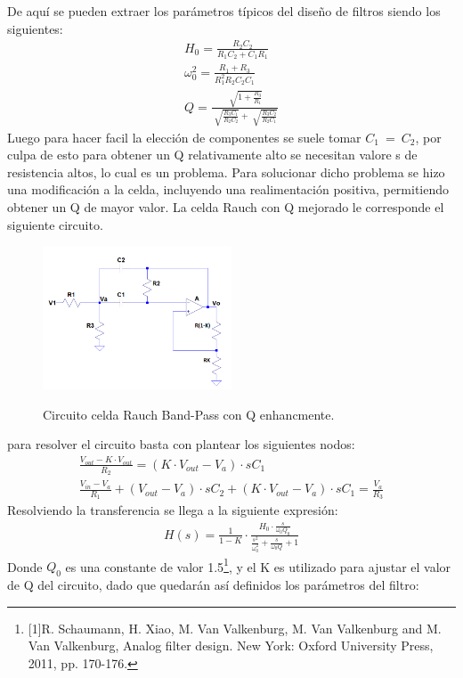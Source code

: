 De aquí se pueden extraer los parámetros típicos del diseño de filtros siendo los siguientes:
\begin{align}
H_0 =\frac{R_2C_2}{R_1C_2+C_1R_1}\\
\omega_0^2= \frac{R_1+R_3}{R_1^2R_2C_2C_1}\\
Q= \frac{\sqrt[]{1+\frac{R_3}{R_1}}}{{\sqrt[]{\frac{R_3C_1}{R_2C_2}}+\sqrt[]{\frac{R_3C_2}{R_2C_1}}}}
\end{align}
Luego para hacer facil la elección de componentes se suele tomar $C_1 \ = \ C_2$, por culpa de esto para obtener un Q relativamente alto se necesitan valore s de resistencia altos, lo cual es un problema.
Para solucionar dicho problema se hizo una modificación a la celda, incluyendo una realimentación positiva, permitiendo obtener un Q de mayor valor.
La celda Rauch con Q mejorado le corresponde el siguiente circuito.
\begin{figure}[H]
	\centering
	\includegraphics[width=0.5\textwidth]{Imagenes-Ej2/Circuit.PNG}
	\label{fig:graph}
	\caption{Circuito celda Rauch Band-Pass con Q enhancmente.}
\end{figure}
para resolver el circuito basta con plantear los siguientes nodos:
\begin{align}
\frac{V_{out}-K \cdot V_{out}}{R_2}=(K \cdot V_{out}-V_a)\cdot sC_1\\ 
\frac{V_{in}-V_a}{R_1}+(V_{out}-V_a)\cdot sC_2 +(K \cdot V_{out}-V_a) \cdot sC_1 = \frac{V_a}{R_3}
\end{align}
Resolviendo la transferencia se llega a la siguiente expresión:
\begin{align}
H(s)=\frac{1}{1-K} \cdot \frac{H_0 \cdot \frac{s}{\omega_0 Q_0}}{\frac{s^2}{\omega_0^2}+\frac{s}{\omega_0Q}+1}
\end{align}
Donde $Q_0$ es una constante de valor 1.5\footnote{[1]R. Schaumann, H. Xiao, M. Van Valkenburg, M. Van Valkenburg and M. Van Valkenburg, Analog filter design. New York: Oxford University Press, 2011, pp. 170-176.}, y el K es utilizado para ajustar el valor de Q del circuito, dado que quedarán así definidos los parámetros del filtro:
